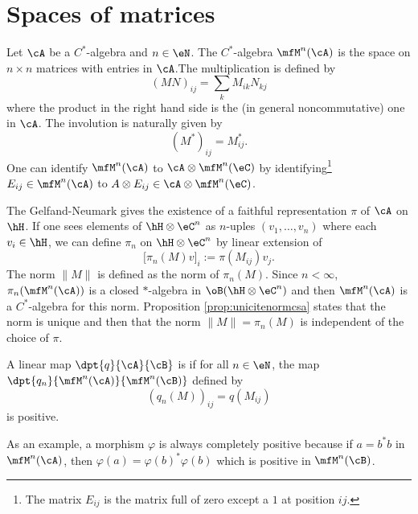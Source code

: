 %
   \section{Spaces of matrices}
%

Let $\cA$ be a $C^*$-algebra and $n\in\eN$. The $C^*$-algebra $\mfM^n(\cA)$ is the space on $n\times n$ matrices with entries in $\cA$.The multiplication is defined by
\begin{equation}
  (MN)_{ij}=\sum_kM_{ik}N_{kj}
\end{equation}
where the product in the right hand side is the (in general noncommutative) one in $\cA$. The involution is naturally given by
\begin{equation}
  (M^*)_{ij}=M_{ij}^*.
\end{equation}
One can identify $\mfM^n(\cA)$ to $\cA\otimes\mfM^n(\eC)$ by identifying\footnote{The matrix $E_{ij}$ is the matrix full of zero except a $1$ at position $ij$.} $E_{ij}\in\mfM^n(\cA)$ to $A\otimes E_{ij}\in\cA\otimes\mfM^n(\eC)$.

The Gelfand-Neumark gives the existence of a faithful representation $\pi$ of $\cA$ on $\hH$. If one sees elements of $\hH\otimes\eC^n$ as $n$-uples $(v_1,\ldots,v_n)$ where each $v_i\in\hH$, we can define $\pi_n$ on $\hH\otimes\eC^n$ by linear extension of 
\begin{equation} \label{eq:defreprezmfM}
  \big[\pi_n(M)v\big]_i:=\pi(M_{ij})v_j.
\end{equation}
The norm $\| M \|$ is defined as the norm of $\pi_n(M)$. Since $n<\infty$, $\pi_n(\mfM^n(\cA))$ is a closed $*$-algebra in $\oB(\hH\otimes\eC^n)$ and then $\mfM^n(\cA)$ is a $C^*$-algebra for this norm. Proposition \ref{prop:unicitenormcsa} states that the norm is unique and then that the norm $\| M \|=\pi_n(M)$ is independent of the choice of $\pi$.

\begin{definition}      \label{DefComplPositive}
    A linear map $\dpt{ q }{ \cA }{ \cB }$ is  if for all $n\in\eN$, the map $\dpt{ q_n }{ \mfM^n(\cA) }{ \mfM^n(\cB) }$ defined by
    \[ 
      (q_n(M))_{ij}=q(M_{ij})
    \]
    is positive. 
\end{definition}
As an example, a morphism $\varphi$ is always completely positive because if $a=b^*b$ in $\mfM^n(\cA)$, then $\varphi(a)=\varphi(b)^*\varphi(b)$ which is positive in $\mfM^n(\cB)$.

